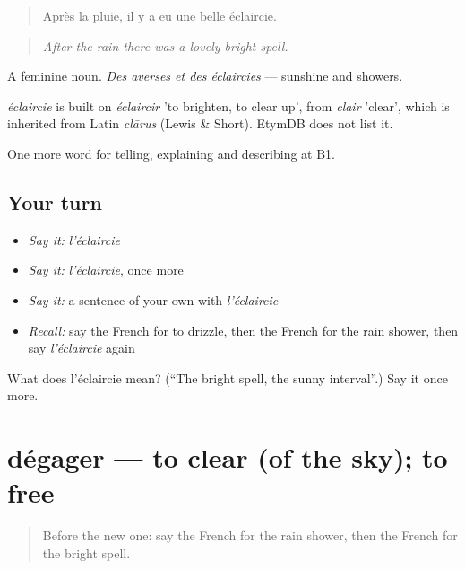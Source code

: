 \begin{quote}
Après la pluie, il y a eu une belle éclaircie.
\end{quote}

\begin{quote}
\emph{After the rain there was a lovely bright spell.}
\end{quote}

A feminine noun. \emph{Des averses et des éclaircies} — sunshine and showers.

\begin{cousinweb}
\emph{éclaircie} is built on \emph{éclaircir} 'to brighten, to clear up', from \emph{clair} 'clear', which is inherited from Latin \emph{clārus} (Lewis \& Short). EtymDB does not list it.
\end{cousinweb}

\begin{grammarlens}[title={What you've built}]
One more word for telling, explaining and describing at B1.
\end{grammarlens}

\subsection*{Your turn}
\begin{itemize}
\raggedright
  \item \emph{Say it:} \emph{l'éclaircie}
  \item \emph{Say it:} \emph{l'éclaircie}, once more
  \item \emph{Say it:} a sentence of your own with \emph{l'éclaircie}
  \item \emph{Recall:} say the French for to drizzle, then the French for the rain shower, then say \emph{l'éclaircie} again
\end{itemize}

\begin{tcolorbox}[breakable,colback=teal!4,colframe=teal!35!black,title={Before you move on}]
What does l'éclaircie mean? (\textquotedblleft{}The bright spell, the sunny interval\textquotedblright{}.) Say it once more.
\end{tcolorbox}
\section[dégager]{dégager — to clear (of the sky); to free}

\label{lesson:FR-C461-degager}



\begin{quote}
Before the new one: say the French for the rain shower, then the French for the bright spell.
\end{quote}

